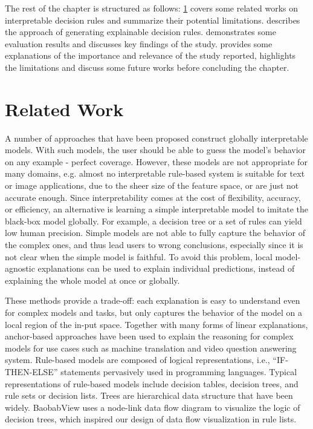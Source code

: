 \hspace*{3.5mm} The rest of the chapter is structured as follows: \cref{chapter_7:rw} covers some related works on interpretable decision rules and summarize their potential limitations.  describes the approach of generating explainable decision rules.  demonstrates some evaluation results and discusses key findings of the study.  provides some explanations of the importance and relevance of the study reported, highlights the limitations and discuss some future works before concluding the chapter.  

\section{Related Work} \label{chapter_7:rw}
A number of approaches that have been proposed construct globally interpretable models. With such models, the user should be able to guess the model’s behavior on any example - perfect coverage. However, these models are not appropriate for many domains, e.g. almost no interpretable rule-based system is suitable for text or image applications, due to the sheer size of the feature space, or are just not accurate enough. 
Since interpretability comes at the cost of flexibility, accuracy, or efficiency, an alternative is learning a simple interpretable model to imitate the black-box model globally. For example, a decision tree or a set of rules can yield low human precision. Simple models are not able to fully capture the behavior of the complex ones, and thus lead users to wrong conclusions, especially since it is not clear when the simple model is faithful. To avoid this problem, local model-agnostic explanations can be used to explain individual predictions, instead of explaining the whole model at once or globally. 

\hspace*{3.5mm} These methods provide a trade-off: each explanation is easy to understand even for complex models and tasks, but only captures the behavior of the model on a local region of the in-put space. Together with many forms of linear explanations, anchor-based approaches have been used to explain the reasoning for complex models for use cases such as machine translation and video question answering system. 
Rule-based models are composed of logical representations, i.e., ``IF-THEN-ELSE'' statements pervasively used in programming languages. Typical representations of rule-based models include decision tables, decision trees, and rule sets or decision lists. Trees are hierarchical data structure that have been widely. BaobabView uses a node-link data flow diagram to visualize the logic of decision trees, which inspired our design of data flow visualization in rule lists. 

